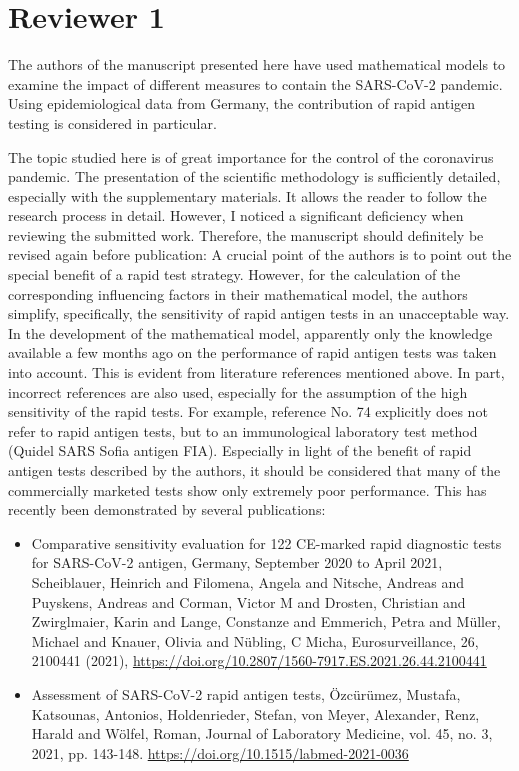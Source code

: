 \documentclass[a4paper,11pt]{article}
\theoremstyle{plain}
\newcommand{\comment}[1]{{\color{black!60}#1}}
\begin{document}
\section*{Reviewer 1}
\comment{
The authors of the manuscript presented here have used mathematical models to examine the impact of different measures to contain the SARS-CoV-2 pandemic. Using epidemiological data from Germany, the contribution of rapid antigen testing is considered in particular.

The topic studied here is of great importance for the control of the coronavirus pandemic. The presentation of the scientific methodology is sufficiently detailed, especially with the supplementary materials. It allows the reader to follow the research process in detail. However, I noticed a significant deficiency when reviewing the submitted work. Therefore, the manuscript should definitely be revised again before publication: A crucial point of the authors is to point out the special benefit of a rapid test strategy. However, for the calculation of the corresponding influencing factors in their mathematical model, the authors simplify, specifically, the sensitivity of rapid antigen tests in an unacceptable way. In the development of the mathematical model, apparently only the knowledge available a few months ago on the performance of rapid antigen tests was taken into account. This is evident from literature references mentioned above. In part, incorrect references are also used, especially for the assumption of the high sensitivity of the rapid tests. For example, reference No. 74 explicitly does not refer to rapid antigen tests, but to an immunological laboratory test method (Quidel SARS Sofia antigen FIA). Especially in light of the benefit of rapid antigen tests described by the authors, it should be considered that many of the commercially marketed tests show only extremely poor performance. This has recently been demonstrated by several publications:
\begin{itemize}
    \item     Comparative sensitivity evaluation for 122 CE-marked rapid diagnostic tests for SARS-CoV-2 antigen, Germany, September 2020 to April 2021, Scheiblauer, Heinrich and Filomena, Angela and Nitsche, Andreas and Puyskens, Andreas and Corman, Victor M and Drosten, Christian and Zwirglmaier, Karin and Lange, Constanze and Emmerich, Petra and Müller, Michael and Knauer, Olivia and Nübling, C Micha, Eurosurveillance, 26, 2100441 (2021), \url{https://doi.org/10.2807/1560-7917.ES.2021.26.44.2100441}
    \item Assessment of SARS-CoV-2 rapid antigen tests, Özcürümez, Mustafa, Katsounas, Antonios, Holdenrieder, Stefan, von Meyer, Alexander, Renz, Harald and Wölfel, Roman, Journal of Laboratory Medicine, vol. 45, no. 3, 2021, pp. 143-148. \url{https://doi.org/10.1515/labmed-2021-0036}
\end{itemize}

}
\end{document}
